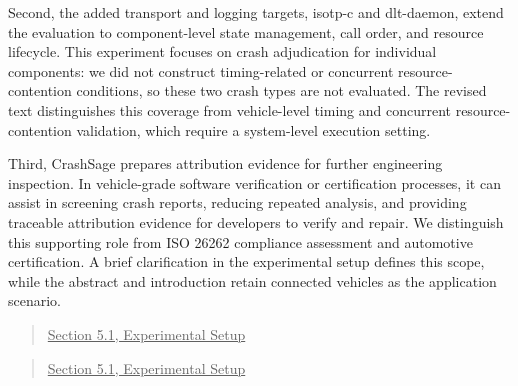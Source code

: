 \documentclass[onecolumn,11pt]{article}
\newcommand{\nc}[2]{\needspace{5\baselineskip}\begin{quote}\underline{#1}\\ \nopagebreak[4]{\leavevmode\color{blue}{``#2"}}\end{quote}}
\begin{document}
Second, the added transport and logging targets, isotp-c and dlt-daemon, extend the evaluation to component-level state management, call order, and resource lifecycle. This experiment focuses on crash adjudication for individual components: we did not construct timing-related or concurrent resource-contention conditions, so these two crash types are not evaluated. The revised text distinguishes this coverage from vehicle-level timing and concurrent resource-contention validation, which require a system-level execution setting.

Third, CrashSage prepares attribution evidence for further engineering inspection. In vehicle-grade software verification or certification processes, it can assist in screening crash reports, reducing repeated analysis, and providing traceable attribution evidence for developers to verify and repair. We distinguish this supporting role from ISO 26262 compliance assessment and automotive certification. A brief clarification in the experimental setup defines this scope, while the abstract and introduction retain connected vehicles as the application scenario.

\nc{Section 5.1, Experimental Setup}{Stateful API sequences in isotp-c and dlt-daemon extend the component-level evaluation to transport and logging lifecycles. This experiment adjudicates crashes of individual components and does not construct timing-related or concurrent resource-contention conditions, so these two crash types are not evaluated here. Vehicle-level timing failures and concurrent resource contention require separate system-level validation. CrashSage provides crash-attribution evidence for further engineering analysis; ISO 26262 compliance assessment and certification remain distinct from the component-level evaluation reported here.}

\nc{Section 5.1, Experimental Setup}{Faults in these components may affect diagnostic records, ECU-to-module communication, configuration or telemetry processing, update and log handling, and in-vehicle media services.}
\end{document}
